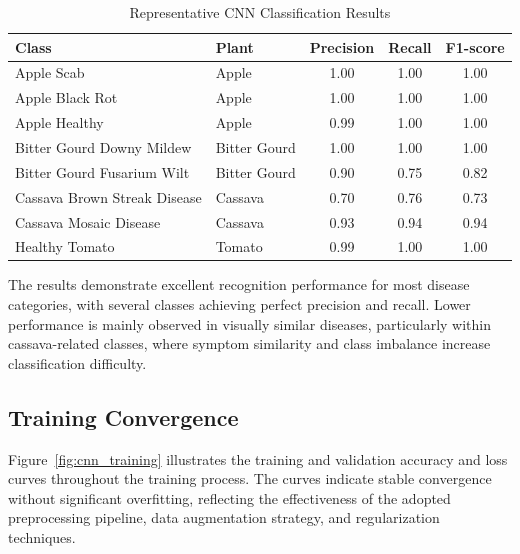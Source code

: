 \begin{table}[H]
\centering
\caption{Representative CNN Classification Results}
\label{tab:cnn_per_class}
\renewcommand{\arraystretch}{1.4}
\begin{tabularx}{\textwidth}{X l c c c}
\toprule
\textbf{Class} &
\textbf{Plant} &
\textbf{Precision} &
\textbf{Recall} &
\textbf{F1-score} \\
\midrule

Apple Scab &
Apple &
1.00 &
1.00 &
1.00 \\

Apple Black Rot &
Apple &
1.00 &
1.00 &
1.00 \\

Apple Healthy &
Apple &
0.99 &
1.00 &
1.00 \\

Bitter Gourd Downy Mildew &
Bitter Gourd &
1.00 &
1.00 &
1.00 \\

Bitter Gourd Fusarium Wilt &
Bitter Gourd &
0.90 &
0.75 &
0.82 \\

Cassava Brown Streak Disease &
Cassava &
0.70 &
0.76 &
0.73 \\

Cassava Mosaic Disease &
Cassava &
0.93 &
0.94 &
0.94 \\

Healthy Tomato &
Tomato &
0.99 &
1.00 &
1.00 \\

\bottomrule
\end{tabularx}
\end{table}

The results demonstrate excellent recognition performance for most disease categories, with several classes achieving perfect precision and recall. Lower performance is mainly observed in visually similar diseases, particularly within cassava-related classes, where symptom similarity and class imbalance increase classification difficulty.

\subsection{Training Convergence}
\label{subsec:cnn_convergence}

Figure~\ref{fig:cnn_training} illustrates the training and validation accuracy and loss curves throughout the training process. The curves indicate stable convergence without significant overfitting, reflecting the effectiveness of the adopted preprocessing pipeline, data augmentation strategy, and regularization techniques.

